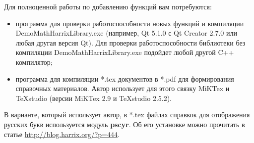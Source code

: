 \documentclass[a4paper,12pt]{article}
\begin{document}
Для полноценной работы по добавлению функций вам потребуются:
\begin{itemize}
\item программа для проверки работоспособности новых функций и компиляции DemoMathHarrixLibrary.exe (например, Qt 5.1.0 с Qt Creator 2.7.0 или любая другая версия Qt). Для проверки работоспособности библиотеки без компиляции DemoMathHarrixLibrary.exe подойдет любой другой C++ компилятор;
\item программа для компиляции *.tex документов в *.pdf для формирования справочных материалов. Автор использует для этого связку MiKTex и TeXstudio (версии MiKTex 2.9 и TeXstudio 2.5.2).
\end{itemize}

В варианте, который использует автор, в *.tex файлах справкок для отображения русских букв используется модуль \textbf{pscyr}. Об его установке можно прочитать в статье \href{http://blog.harrix.org/?p=444}{http://blog.harrix.org/?p=444}.
\end{document}
